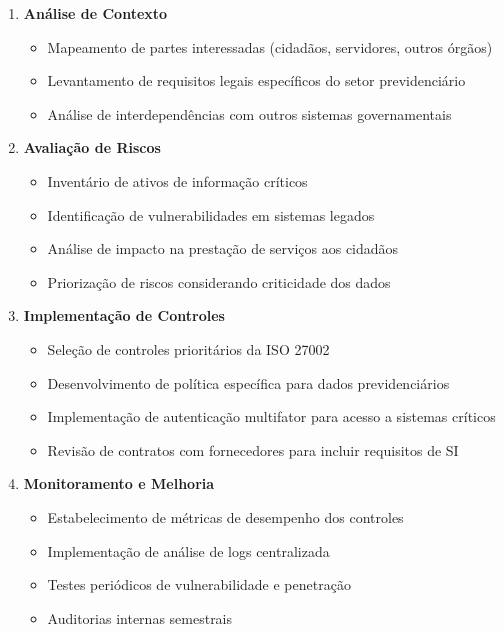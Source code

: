 \documentclass[12pt,a4paper]{report}
\begin{document}
\begin{enumerate}
  \item \textbf{Análise de Contexto}
  \begin{itemize}
    \item Mapeamento de partes interessadas (cidadãos, servidores, outros órgãos)
    \item Levantamento de requisitos legais específicos do setor previdenciário
    \item Análise de interdependências com outros sistemas governamentais
  \end{itemize}

  \item \textbf{Avaliação de Riscos}
  \begin{itemize}
    \item Inventário de ativos de informação críticos
    \item Identificação de vulnerabilidades em sistemas legados
    \item Análise de impacto na prestação de serviços aos cidadãos
    \item Priorização de riscos considerando criticidade dos dados
  \end{itemize}

  \item \textbf{Implementação de Controles}
  \begin{itemize}
    \item Seleção de controles prioritários da ISO 27002
    \item Desenvolvimento de política específica para dados previdenciários
    \item Implementação de autenticação multifator para acesso a sistemas críticos
    \item Revisão de contratos com fornecedores para incluir requisitos de SI
  \end{itemize}

  \item \textbf{Monitoramento e Melhoria}
  \begin{itemize}
    \item Estabelecimento de métricas de desempenho dos controles
    \item Implementação de análise de logs centralizada
    \item Testes periódicos de vulnerabilidade e penetração
    \item Auditorias internas semestrais
  \end{itemize}
\end{enumerate}
\end{document}
